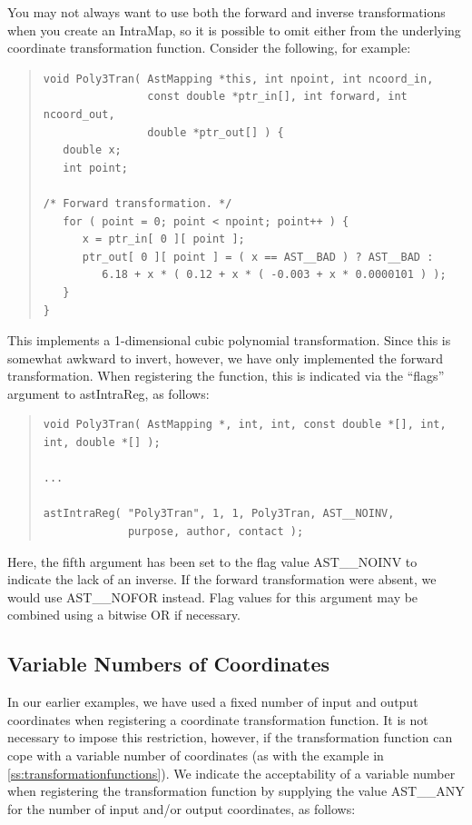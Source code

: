 \documentclass[twoside,11pt]{article}
\newcommand{\htmlref}[2]{#1}
\newcommand{\secref}[1]{\S\ref{#1}}
\renewcommand{\secref}[1]{\ref{#1}}
\begin{document}
You may not always want to use both the forward and inverse
transformations when you create an \htmlref{IntraMap}{IntraMap}, so it is possible to omit
either from the underlying coordinate transformation
function. Consider the following, for example:

\begin{quote}
\small
\begin{verbatim}
void Poly3Tran( AstMapping *this, int npoint, int ncoord_in,
                const double *ptr_in[], int forward, int ncoord_out,
                double *ptr_out[] ) {
   double x;
   int point;

/* Forward transformation. */
   for ( point = 0; point < npoint; point++ ) {
      x = ptr_in[ 0 ][ point ];
      ptr_out[ 0 ][ point ] = ( x == AST__BAD ) ? AST__BAD :
         6.18 + x * ( 0.12 + x * ( -0.003 + x * 0.0000101 ) );
   }
}
\end{verbatim}
\normalsize
\end{quote}

This implements a 1-dimensional cubic polynomial transformation. Since
this is somewhat awkward to invert, however, we have only implemented
the forward transformation.  When registering the function, this is
indicated via the ``flags'' argument to \htmlref{astIntraReg}{astIntraReg}, as follows:

\begin{quote}
\small
\begin{verbatim}
void Poly3Tran( AstMapping *, int, int, const double *[], int, int, double *[] );

...

astIntraReg( "Poly3Tran", 1, 1, Poly3Tran, AST__NOINV,
             purpose, author, contact );
\end{verbatim}
\normalsize
\end{quote}

Here, the fifth argument has been set to the flag value AST\_\_NOINV
to indicate the lack of an inverse. If the forward transformation were
absent, we would use AST\_\_NOFOR instead. Flag values for this
argument may be combined using a bitwise OR if necessary.

\subsection{\label{ss:variableintramapcoordinates}Variable Numbers of Coordinates}

In our earlier examples, we have used a fixed number of input and
output coordinates when registering a coordinate transformation
function. It is not necessary to impose this restriction, however, if
the transformation function can cope with a variable number of
coordinates (as with the example in
\secref{ss:transformationfunctions}). We indicate the acceptability of
a variable number when registering the transformation function by
supplying the value AST\_\_ANY for the number of input and/or output
coordinates, as follows:
\end{document}
